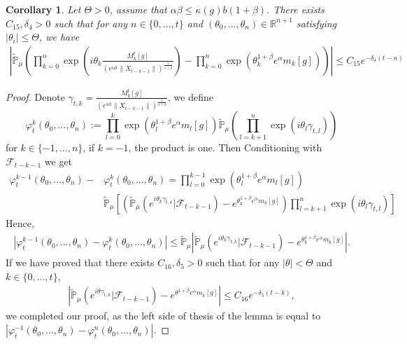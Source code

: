 \documentclass[12pt, a4paper]{amsart}
\newtheorem{cor}[thm]{Corollary}
\theoremstyle{definition}
\numberwithin{equation}{section}
\begin{document}
\begin{cor}\label{corollary31}
Let $\Theta>0$, assume that $\alpha\beta\leq\kappa(g)b(1+\beta)$. There exists $C_{15},\delta_4>0$ such that for any $n \in \{0,...,t\}$ and $(\theta_0,...,\theta_n)\in \mathbb{R}^{n+1}$ satisfying $|\theta_i|\leq \Theta$, we have
\begin{align*}
    \left|\mathbb{\tilde{P}}_{\mu}\left(\prod_{k=0}^n\exp(i\theta_k \frac {M_k^t[g]}{(e^{\alpha k}\|X_{t-k-1}\|)^\frac{1}{1+\beta}})-\prod_{k=0}^n\exp(\theta_k^{1+\beta}e^{\alpha}m_k[g])\right)\right|\leq C_{15}e^{-\delta_4(t-n)}
\end{align*}
\end{cor}
\begin{proof}
    Denote $\gamma_{t,k}=\frac {M_k^t[g]}{(e^{\alpha k}\|X_{t-k-1}\|)^\frac{1}{1+\beta}} $, we define
    $$\varphi^k_t(\theta_0,...,\theta_n):=\prod_{l=0}^{k}\exp\left(\theta_l^{1+\beta}e^{\alpha}m_l[g]\right)\mathbb{\tilde{P}}_{\mu}\left(\prod_{l=k+1}^{n}\exp\left(i\theta_l\gamma_{t,l}\right)\right)$$
    for $k\in\{-1,...,n\}$, if $k=-1$, the product is one. Then Conditioning with $\mathcal{F}_{t-k-1}$ we get
    \begin{align*}
        \varphi^{k-1}_t(\theta_0,...,\theta_n)-&\varphi^{k}_t(\theta_0,...,\theta_n)=\prod_{l=0}^{k-1}\exp\left(\theta_l^{1+\beta}e^{\alpha}m_l[g]\right)\\
        &\mathbb{\tilde{P}}_{\mu}\left[\left(\mathbb{\tilde{P}}_{\mu}\left(e^{i\theta_k \gamma_{t,k}}|\mathcal{F}_{t-k-1}\right)-e^{\theta_k^{1+\beta}e^{\alpha}m_k[g]}\right)\prod_{l=k+1}^n\exp(i\theta_l \gamma_{t,l})\right]
    \end{align*}
    Hence,
    \begin{align*}
        \left|\varphi^{k-1}_t(\theta_0,...,\theta_n)-\varphi^{k}_t(\theta_0,...,\theta_n)\right| \leq \mathbb{\tilde{P}}_{\mu}\left|\mathbb{\tilde{P}}_{\mu}\left(e^{i\theta_k \gamma_{t,k}}|\mathcal{F}_{t-k-1}\right)-e^{\theta_k^{1+\beta}e^{\alpha}m_k[g]}\right|.
    \end{align*}
    If we have proved that there exists $C_{16},\delta_5>0$ such that for any $|\theta|<\Theta$ and $k\in \{0,...,t\}$,
    \begin{align}
        \left|\mathbb{\tilde{P}}_{\mu}\left(e^{i\theta \gamma_{t,k}}|\mathcal{F}_{t-k-1}\right)-e^{\theta^{1+\beta}e^{\alpha}m_k[g]}\right|\leq C_{16} e^{-\delta_5(t-k)},
    \end{align}
    we completed our proof, as the left side of thesis of the lemma is equal to $\left|\varphi^{-1}_t(\theta_0,...,\theta_n)-\varphi^{n}_t(\theta_0,...,\theta_n)\right|$.


\end{proof}
\end{document}
